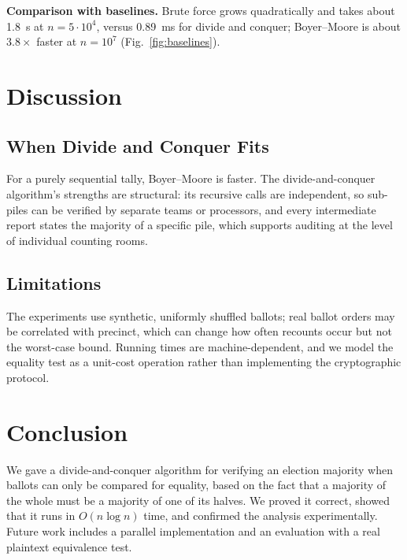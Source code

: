 \documentclass[conference]{IEEEtran}
\begin{document}
\textbf{Comparison with baselines.} Brute force grows
quadratically and takes about 1.8~s at $n = 5\cdot 10^4$, versus 0.89~ms for
divide and conquer; Boyer--Moore is about $3.8\times$ faster at $n = 10^7$
(Fig.~\ref{fig:baselines}).

\section{Discussion}

\subsection{When Divide and Conquer Fits}

For a purely sequential tally, Boyer--Moore is faster. The
divide-and-conquer algorithm's strengths are structural: its recursive calls
are independent, so sub-piles can be verified by separate teams or processors,
and every intermediate report states the majority of a specific pile, which
supports auditing at the level of individual counting rooms.

\subsection{Limitations}

The experiments use synthetic, uniformly shuffled ballots; real ballot
orders may be correlated with precinct, which can change how often recounts
occur but not the worst-case bound. Running times are machine-dependent, and
we model the equality test as a unit-cost operation rather than implementing
the cryptographic protocol.

\section{Conclusion}

We gave a divide-and-conquer algorithm for verifying an election majority
when ballots can only be compared for equality, based on the fact that a
majority of the whole must be a majority of one of its halves. We proved it
correct, showed that it runs in $O(n\log n)$ time, and confirmed the analysis
experimentally. Future work includes a parallel implementation and an
evaluation with a real plaintext equivalence test.
\end{document}
